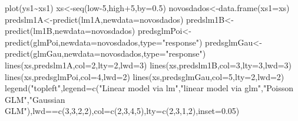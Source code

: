 \documentclass[
]{book}
\newenvironment{Shaded}{\begin{snugshade}}{\end{snugshade}}
\newcommand{\AttributeTok}[1]{\textcolor[rgb]{0.77,0.63,0.00}{#1}}
\newcommand{\DecValTok}[1]{\textcolor[rgb]{0.00,0.00,0.81}{#1}}
\newcommand{\FloatTok}[1]{\textcolor[rgb]{0.00,0.00,0.81}{#1}}
\newcommand{\FunctionTok}[1]{\textcolor[rgb]{0.00,0.00,0.00}{#1}}
\newcommand{\NormalTok}[1]{#1}
\newcommand{\OtherTok}[1]{\textcolor[rgb]{0.56,0.35,0.01}{#1}}
\newcommand{\SpecialCharTok}[1]{\textcolor[rgb]{0.00,0.00,0.00}{#1}}
\newcommand{\StringTok}[1]{\textcolor[rgb]{0.31,0.60,0.02}{#1}}
\begin{document}
\begin{Shaded}
\begin{Highlighting}[]
\FunctionTok{plot}\NormalTok{(ys1}\SpecialCharTok{\textasciitilde{}}\NormalTok{xs1)}
\NormalTok{xs}\OtherTok{\textless{}{-}}\FunctionTok{seq}\NormalTok{(low}\DecValTok{{-}5}\NormalTok{,high}\SpecialCharTok{+}\DecValTok{5}\NormalTok{,}\AttributeTok{by=}\FloatTok{0.5}\NormalTok{)}
\NormalTok{novosdados}\OtherTok{\textless{}{-}}\FunctionTok{data.frame}\NormalTok{(}\AttributeTok{xs1=}\NormalTok{xs)}
\NormalTok{predslm1A}\OtherTok{\textless{}{-}}\FunctionTok{predict}\NormalTok{(lm1A,}\AttributeTok{newdata=}\NormalTok{novosdados)}
\NormalTok{predslm1B}\OtherTok{\textless{}{-}}\FunctionTok{predict}\NormalTok{(lm1B,}\AttributeTok{newdata=}\NormalTok{novosdados)}
\NormalTok{predsglmPoi}\OtherTok{\textless{}{-}}\FunctionTok{predict}\NormalTok{(glmPoi,}\AttributeTok{newdata=}\NormalTok{novosdados,}\AttributeTok{type=}\StringTok{"response"}\NormalTok{)}
\NormalTok{predsglmGau}\OtherTok{\textless{}{-}}\FunctionTok{predict}\NormalTok{(glmGau,}\AttributeTok{newdata=}\NormalTok{novosdados,}\AttributeTok{type=}\StringTok{"response"}\NormalTok{)}
\FunctionTok{lines}\NormalTok{(xs,predslm1A,}\AttributeTok{col=}\DecValTok{2}\NormalTok{,}\AttributeTok{lty=}\DecValTok{2}\NormalTok{,}\AttributeTok{lwd=}\DecValTok{3}\NormalTok{)}
\FunctionTok{lines}\NormalTok{(xs,predslm1B,}\AttributeTok{col=}\DecValTok{3}\NormalTok{,}\AttributeTok{lty=}\DecValTok{3}\NormalTok{,}\AttributeTok{lwd=}\DecValTok{3}\NormalTok{)}
\FunctionTok{lines}\NormalTok{(xs,predsglmPoi,}\AttributeTok{col=}\DecValTok{4}\NormalTok{,}\AttributeTok{lwd=}\DecValTok{2}\NormalTok{)}
\FunctionTok{lines}\NormalTok{(xs,predsglmGau,}\AttributeTok{col=}\DecValTok{5}\NormalTok{,}\AttributeTok{lty=}\DecValTok{2}\NormalTok{,}\AttributeTok{lwd=}\DecValTok{2}\NormalTok{)}
\FunctionTok{legend}\NormalTok{(}\StringTok{"topleft"}\NormalTok{,}\AttributeTok{legend=}\FunctionTok{c}\NormalTok{(}\StringTok{"Linear model via lm"}\NormalTok{,}\StringTok{"linear model via glm"}\NormalTok{,}\StringTok{"Poisson GLM"}\NormalTok{,}\StringTok{"Gaussian GLM"}\NormalTok{),lwd}\SpecialCharTok{==}\FunctionTok{c}\NormalTok{(}\DecValTok{3}\NormalTok{,}\DecValTok{3}\NormalTok{,}\DecValTok{2}\NormalTok{,}\DecValTok{2}\NormalTok{),}\AttributeTok{col=}\FunctionTok{c}\NormalTok{(}\DecValTok{2}\NormalTok{,}\DecValTok{3}\NormalTok{,}\DecValTok{4}\NormalTok{,}\DecValTok{5}\NormalTok{),}\AttributeTok{lty=}\FunctionTok{c}\NormalTok{(}\DecValTok{2}\NormalTok{,}\DecValTok{3}\NormalTok{,}\DecValTok{1}\NormalTok{,}\DecValTok{2}\NormalTok{),}\AttributeTok{inset=}\FloatTok{0.05}\NormalTok{)}
\end{Highlighting}
\end{Shaded}
\end{document}
